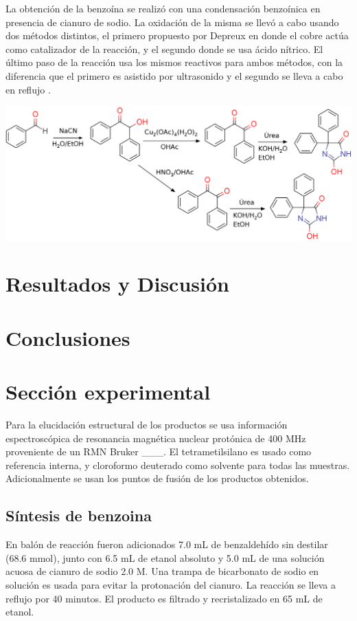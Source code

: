 \documentclass[fleqn,10pt]{SelfArx}
\begin{document}
\newpage

La obtenci\'on de la benzo\'ina se realiz\'o con una condensaci\'on benzo\'inica en presencia de cianuro de sodio. La oxidaci\'on de la misma se llev\'o a cabo usando dos m\'etodos distintos, el primero propuesto por Depreux \cite{depreux1988} en donde el cobre act\'ua como catalizador de la reacci\'on, y el segundo donde se usa \'acido n\'itrico. El \'ultimo paso de la reacci\'on usa los mismos reactivos para ambos m\'etodos, con la diferencia que el primero es asistido por ultrasonido y el segundo se lleva a cabo en reflujo \cite{safari2010}.
\begin{scheme}[h]
	\centering
	\includegraphics[width=\linewidth]{structures/complete.png}
	\caption{S\'intesis del Dilantin con las dos rutas seguidas en el laboratorio.}
\end{scheme}


\newpage
\section{Resultados y Discusi\'on}
\section{Conclusiones}
\section{Secci\'on experimental}
Para la elucidaci\'on estructural de los productos se usa informaci\'on espectrosc\'opica de resonancia magn\'etica nuclear prot\'onica de 400 MHz proveniente de un RMN Bruker \_\_\_. El tetrametilsilano es usado como referencia interna, y cloroformo deuterado como solvente para todas las muestras. Adicionalmente se usan los puntos de fusi\'on de los productos obtenidos.

\subsection{S\'intesis de benzoina}
En bal\'on de reacci\'on fueron adicionados 7.0 mL de benzaldeh\'ido sin destilar (68.6 mmol), junto con 6.5 mL de etanol absoluto y 5.0 mL de una soluci\'on acuosa de cianuro de sodio 2.0 M. Una trampa de bicarbonato de sodio en soluci\'on es usada para evitar la protonaci\'on del cianuro. La reacci\'on se lleva a reflujo por 40 minutos. El producto es filtrado y recristalizado en 65 mL de etanol.
\end{document}
